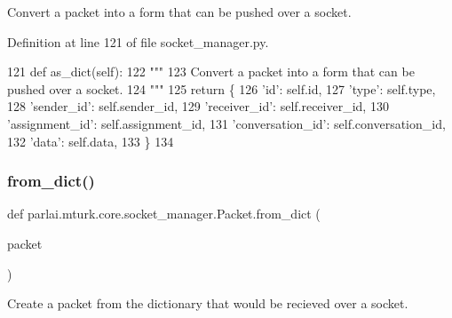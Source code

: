 \begin{DoxyVerb}Convert a packet into a form that can be pushed over a socket.
\end{DoxyVerb}
 

Definition at line 121 of file socket\+\_\+manager.\+py.


\begin{DoxyCode}
121     \textcolor{keyword}{def }as\_dict(self):
122         \textcolor{stringliteral}{"""}
123 \textcolor{stringliteral}{        Convert a packet into a form that can be pushed over a socket.}
124 \textcolor{stringliteral}{        """}
125         \textcolor{keywordflow}{return} \{
126             \textcolor{stringliteral}{'id'}: self.id,
127             \textcolor{stringliteral}{'type'}: self.type,
128             \textcolor{stringliteral}{'sender\_id'}: self.sender\_id,
129             \textcolor{stringliteral}{'receiver\_id'}: self.receiver\_id,
130             \textcolor{stringliteral}{'assignment\_id'}: self.assignment\_id,
131             \textcolor{stringliteral}{'conversation\_id'}: self.conversation\_id,
132             \textcolor{stringliteral}{'data'}: self.data,
133         \}
134 
\end{DoxyCode}
\mbox{\label{classparlai_1_1mturk_1_1core_1_1socket__manager_1_1Packet_aa186d3b3ba07b6c2eba5e241cbaf92f8}} 
\subsubsection{\texorpdfstring{from\+\_\+dict()}{from\_dict()}}
{\footnotesize\ttfamily def parlai.\+mturk.\+core.\+socket\+\_\+manager.\+Packet.\+from\+\_\+dict (\begin{DoxyParamCaption}\item[{}]{packet }\end{DoxyParamCaption})\hspace{0.3cm}{\ttfamily [static]}}

\begin{DoxyVerb}Create a packet from the dictionary that would be recieved over a socket.
\end{DoxyVerb}
 

